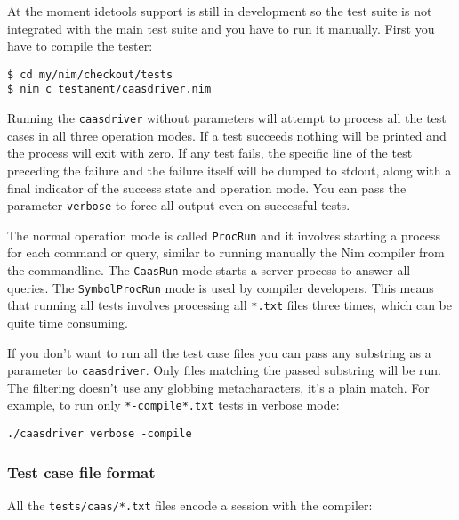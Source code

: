 At the moment idetools support is still in development so the test suite
is not integrated with the main test suite and you have to run it
manually. First you have to compile the tester:

\begin{verbatim}
$ cd my/nim/checkout/tests
$ nim c testament/caasdriver.nim
\end{verbatim}

Running the \texttt{caasdriver} without parameters will attempt to
process all the test cases in all three operation modes. If a test
succeeds nothing will be printed and the process will exit with zero. If
any test fails, the specific line of the test preceding the failure and
the failure itself will be dumped to stdout, along with a final
indicator of the success state and operation mode. You can pass the
parameter \texttt{verbose} to force all output even on successful tests.

The normal operation mode is called \texttt{ProcRun} and it involves
starting a process for each command or query, similar to running
manually the Nim compiler from the commandline. The \texttt{CaasRun}
mode starts a server process to answer all queries. The
\texttt{SymbolProcRun} mode is used by compiler developers. This means
that running all tests involves processing all \texttt{*.txt} files
three times, which can be quite time consuming.

If you don't want to run all the test case files you can pass any
substring as a parameter to \texttt{caasdriver}. Only files matching the
passed substring will be run. The filtering doesn't use any globbing
metacharacters, it's a plain match. For example, to run only
\texttt{*-compile*.txt} tests in verbose mode:

\begin{verbatim}
./caasdriver verbose -compile
\end{verbatim}

\hypertarget{test-case-file-format}{%
\subsubsection{Test case file format}\label{test-case-file-format}}

All the \texttt{tests/caas/*.txt} files encode a session with the
compiler:

